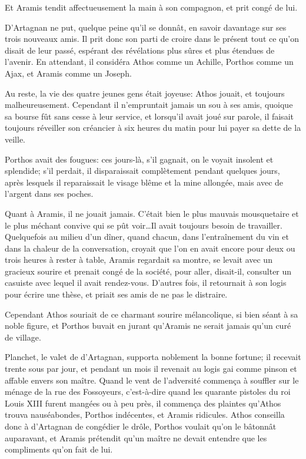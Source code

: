 Et Aramis tendit affectueusement la main à son compagnon, et prit congé de lui. 

D'Artagnan ne put, quelque peine qu'il se donnât, en savoir davantage sur ses trois nouveaux amis. Il prit donc son parti de croire dans le présent tout ce qu'on disait de leur passé, espérant des révélations plus sûres et plus étendues de l'avenir. En attendant, il considéra Athos comme un Achille, Porthos comme un Ajax, et Aramis comme un Joseph. 

Au reste, la vie des quatre jeunes gens était joyeuse: Athos jouait, et toujours malheureusement. Cependant il n'empruntait jamais un sou à ses amis, quoique sa bourse fût sans cesse à leur service, et lorsqu'il avait joué sur parole, il faisait toujours réveiller son créancier à six heures du matin pour lui payer sa dette de la veille. 

Porthos avait des fougues: ces jours-là, s'il gagnait, on le voyait insolent et splendide; s'il perdait, il disparaissait complètement pendant quelques jours, après lesquels il reparaissait le visage blême et la mine allongée, mais avec de l'argent dans ses poches. 

Quant à Aramis, il ne jouait jamais. C'était bien le plus mauvais mousquetaire et le plus méchant convive qui se pût voir\dots Il avait toujours besoin de travailler. Quelquefois au milieu d'un dîner, quand chacun, dans l'entraînement du vin et dans la chaleur de la conversation, croyait que l'on en avait encore pour deux ou trois heures à rester à table, Aramis regardait sa montre, se levait avec un gracieux sourire et prenait congé de la société, pour aller, disait-il, consulter un casuiste avec lequel il avait rendez-vous. D'autres fois, il retournait à son logis pour écrire une thèse, et priait ses amis de ne pas le distraire. 

Cependant Athos souriait de ce charmant sourire mélancolique, si bien séant à sa noble figure, et Porthos buvait en jurant qu'Aramis ne serait jamais qu'un curé de village. 

Planchet, le valet de d'Artagnan, supporta noblement la bonne fortune; il recevait trente sous par jour, et pendant un mois il revenait au logis gai comme pinson et affable envers son maître. Quand le vent de l'adversité commença à souffler sur le ménage de la rue des Fossoyeurs, c'est-à-dire quand les quarante pistoles du roi Louis XIII furent mangées ou à peu près, il commença des plaintes qu'Athos trouva nauséabondes, Porthos indécentes, et Aramis ridicules. Athos conseilla donc à d'Artagnan de congédier le drôle, Porthos voulait qu'on le bâtonnât auparavant, et Aramis prétendit qu'un maître ne devait entendre que les compliments qu'on fait de lui. 

